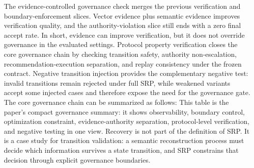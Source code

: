 {}The evidence-controlled governance check merges the previous verification and boundary-enforcement slices. Vector evidence plus semantic evidence improves verification quality, and the authority-violation slice still ends with a zero final accept rate. In short, evidence can improve verification, but it does not override governance in the evaluated settings.\markdownRendererParagraphSeparator
{}Protocol property verification closes the core governance chain by checking transition safety, authority non-escalation, recommendation-execution separation, and replay consistency under the frozen contract. Negative transition injection provides the complementary negative test: invalid transitions remain rejected under full SRP, while weakened variants accept some injected cases and therefore expose the need for the governance gate.\markdownRendererParagraphSeparator
{}The core governance chain can be summarized as follows:\markdownRendererInterblockSeparator
{}\markdownRendererInterblockSeparator
{}This table is the paper's compact governance summary: it shows observability, boundary control, optimization constraint, evidence-authority separation, protocol-level verification, and negative testing in one view.\markdownRendererInterblockSeparator
{}
\markdownRendererSectionEnd \markdownRendererSectionBegin
{}\markdownRendererInterblockSeparator
{}\markdownRendererSectionBegin
{}\markdownRendererInterblockSeparator
{}Recovery is not part of the definition of SRP. It is a case study for transition validation: a semantic reconstruction process must decide which information survives a state transition, and SRP constrains that decision through explicit governance boundaries.\markdownRendererParagraphSeparator
